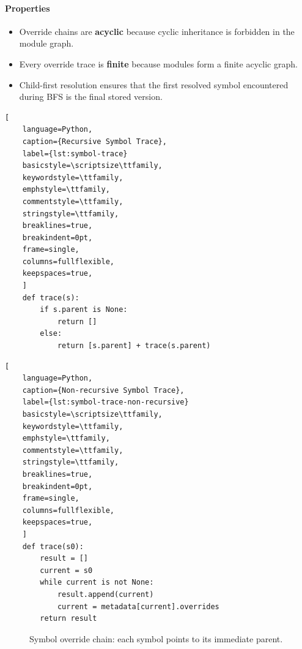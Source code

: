 \documentclass[sigplan,screen]{acmart}
\begin{document}
\paragraph{Properties}
\begin{itemize}
    \item Override chains are \textbf{acyclic} because cyclic inheritance is forbidden in the module graph.
    \item Every override trace is \textbf{finite} because modules form a finite acyclic graph.
    \item Child-first resolution ensures that the first resolved symbol encountered during BFS is the final stored version.
\end{itemize}

\begin{lstlisting}[
    language=Python,
    caption={Recursive Symbol Trace},
    label={lst:symbol-trace}
    basicstyle=\scriptsize\ttfamily,
    keywordstyle=\ttfamily,
    emphstyle=\ttfamily,
    commentstyle=\ttfamily,
    stringstyle=\ttfamily,
    breaklines=true,
    breakindent=0pt,
    frame=single,
    columns=fullflexible,
    keepspaces=true,
    ]
    def trace(s):
        if s.parent is None:
            return []
        else:
            return [s.parent] + trace(s.parent)
\end{lstlisting}

\begin{lstlisting}[
    language=Python,
    caption={Non-recursive Symbol Trace},
    label={lst:symbol-trace-non-recursive}
    basicstyle=\scriptsize\ttfamily,
    keywordstyle=\ttfamily,
    emphstyle=\ttfamily,
    commentstyle=\ttfamily,
    stringstyle=\ttfamily,
    breaklines=true,
    breakindent=0pt,
    frame=single,
    columns=fullflexible,
    keepspaces=true,
    ]
    def trace(s0):
        result = []
        current = s0
        while current is not None:
            result.append(current)
            current = metadata[current].overrides
        return result
\end{lstlisting}

\begin{figure}[h]
\centering
{}
\caption{Symbol override chain: each symbol points to its immediate parent.}
\label{fig:symbol-trace-diagram}
\end{figure}
\end{document}
